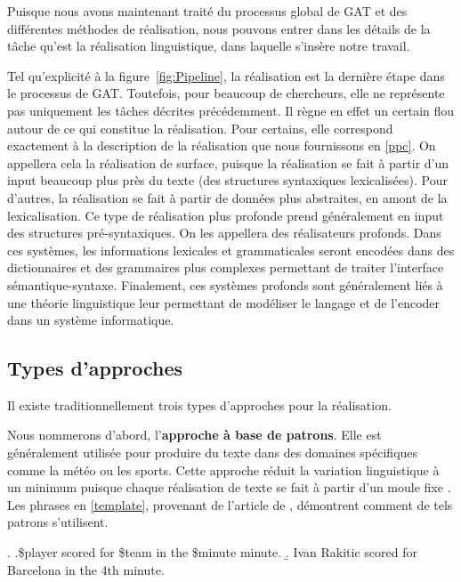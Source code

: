 Puisque nous avons maintenant traité du processus global de \ac{GAT} et des différentes méthodes de réalisation, nous pouvons entrer dans les détails de la tâche qu'est la réalisation linguistique, dans laquelle s'insère notre travail.

Tel qu'explicité à la figure~\ref{fig:Pipeline}, la réalisation est la dernière étape dans le processus de \ac{GAT}. Toutefois, pour beaucoup de chercheurs, elle ne représente pas uniquement les tâches décrites précédemment. Il règne en effet un certain flou autour de ce qui constitue la réalisation. Pour certains, elle correspond exactement à la description de la réalisation que nous fournissons en \ref{ppc}. On appellera cela la réalisation de surface, puisque la réalisation se fait à partir d'un input beaucoup plus près du texte (des structures syntaxiques lexicalisées). Pour d'autres, la réalisation se fait à partir de données plus abstraites, en amont de la lexicalisation. Ce type de réalisation plus profonde prend généralement en input des structures pré-syntaxiques. On les appellera des réalisateurs profonds. Dans ces systèmes, les informations lexicales et grammaticales seront encodées dans des dictionnaires et des grammaires plus complexes permettant de traiter l'interface sémantique-syntaxe. Finalement, ces systèmes profonds sont généralement liés à une théorie linguistique leur permettant de modéliser le langage et de l'encoder dans un système informatique.

\subsection{Types d'approches}

Il existe traditionnellement trois types d'approches pour la réalisation.

Nous nommerons d'abord, l'\textbf{approche à base de patrons}. Elle est généralement utilisée pour produire du texte dans des domaines spécifiques comme la météo ou les sports. Cette approche réduit la variation linguistique à un minimum puisque chaque réalisation de texte se fait à partir d'un moule fixe \citep{mcroy_channarukul_ali_2003}. Les phrases en \ref{template}, provenant de l'article de \cite{gatt18}, démontrent comment de tels patrons s'utilisent.

\ex. \label{template}
	\a.\$player scored for \$team in the \$minute minute. \label{a.}
	\b. Ivan Rakitic scored for Barcelona in the 4th minute.

